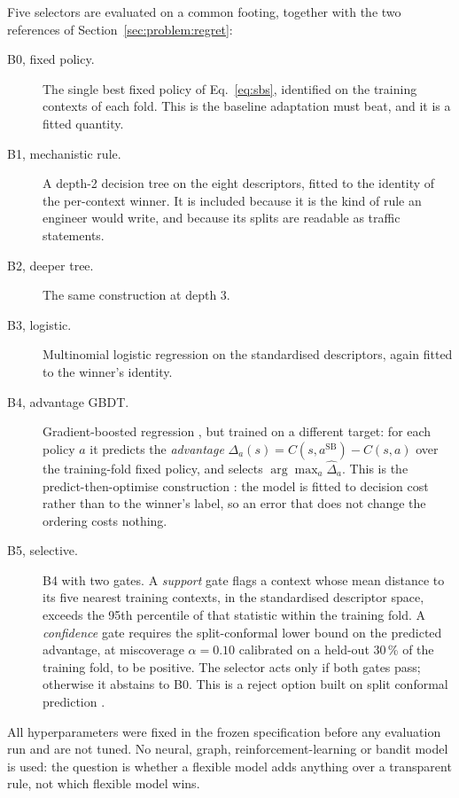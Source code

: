 Five selectors are evaluated on a common footing, together with the two
references of Section~\ref{sec:problem:regret}:

\begin{description}
\item[B0, fixed policy.] The single best fixed policy of Eq.~\eqref{eq:sbs},
identified on the training contexts of each fold. This is the baseline
adaptation must beat, and it is a fitted quantity.
\item[B1, mechanistic rule.] A depth-2 decision tree on the eight descriptors,
fitted to the identity of the per-context winner. It is included because it is
the kind of rule an engineer would write, and because its splits are readable as
traffic statements.
\item[B2, deeper tree.] The same construction at depth 3.
\item[B3, logistic.] Multinomial logistic regression on the standardised
descriptors, again fitted to the winner's identity.
\item[B4, advantage GBDT.] Gradient-boosted regression
\citep{friedman2001gbm,ke2017lightgbm}, but trained on a different target: for
each policy $a$ it predicts the \emph{advantage}
$\Delta_a(s) = C(s,a^{\mathrm{SB}}) - C(s,a)$ over the training-fold fixed
policy, and selects $\arg\max_a \hat\Delta_a$. This is the predict-then-optimise
construction \citep{elmachtoub2022spo}: the model is fitted to decision cost
rather than to the winner's label, so an error that does not change the ordering
costs nothing.
\item[B5, selective.] B4 with two gates. A \emph{support} gate flags a context
whose mean distance to its five nearest training contexts, in the standardised
descriptor space, exceeds the 95th percentile of that statistic within the
training fold. A \emph{confidence} gate requires the split-conformal lower bound
on the predicted advantage, at miscoverage $\alpha=0.10$ calibrated on a held-out
30\,\% of the training fold, to be positive. The selector acts only if both gates
pass; otherwise it abstains to B0. This is a reject option
\citep{chow1970reject} built on split conformal prediction
\citep{vovk2005alrw,lei2018conformal}.
\end{description}

All hyperparameters were fixed in the frozen specification before any evaluation
run and are not tuned. No neural, graph, reinforcement-learning or bandit model
is used: the question is whether a flexible model adds anything over a
transparent rule, not which flexible model wins.

